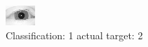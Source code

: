 \begin{figure}[h!]
\begin{center}
\includegraphics[width=0.60\columnwidth]{figures/ID3074_class_1_target_2.png}
\end{center}
\caption{ Classification: 1 actual target: 2}
\label{fig:ID3074_class_1_target_2}
\end{figure}
